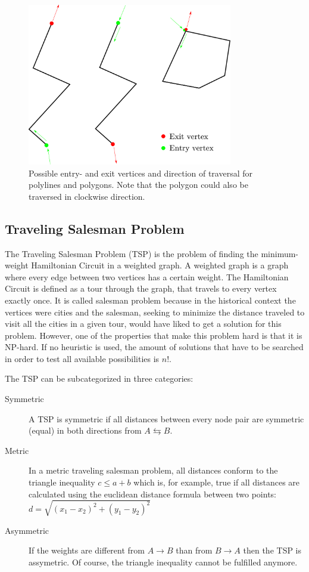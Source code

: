 \documentclass[10pt,twoside,a4paper]{report}
\begin{document}
\begin{figure}
\includegraphics[width=0.8\textwidth]{images/path_planning/traversal.pdf}
\caption{Possible entry- and exit vertices and direction of traversal for polylines and polygons. Note that the polygon could also be traversed in clockwise direction.}
\end{figure}

\subsection{Traveling Salesman Problem}

The Traveling Salesman Problem (TSP) is the problem of finding the minimum-weight Hamiltonian Circuit in a weighted graph. A weighted graph is a graph where every edge between two vertices has a certain weight. The Hamiltonian Circuit is defined as a tour through the graph, that travels to every vertex exactly once. It is called salesman problem because in the historical context the vertices were cities and the salesman, seeking to minimize the distance traveled to visit all the cities in a given tour, would have liked to get a solution for this problem. However, one of the properties that make this problem hard is that it is NP-hard. If no heuristic is used, the amount of solutions that have to be searched in order to test all available possibilities is $n!$.

The TSP can be subcategorized in three categories: 

\begin{description}
\item[Symmetric] A TSP is symmetric if all distances between every node pair are symmetric (equal) in both directions from $A \leftrightarrows B$.
\item[Metric] In a metric traveling salesman problem, all distances conform to the triangle inequality $c \leq a + b$ which is, for example, true if all distances are calculated using the euclidean distance formula between two points: $d = \sqrt{(x_1 -x_2)^2 + (y_1 - y_2)^2}$ 
\item[Asymmetric] If the weights are different from $A \rightarrow B$ than from $B \rightarrow A$ then the TSP is assymetric. Of course, the triangle inequality cannot be fulfilled anymore.
\end{description}
\end{document}
